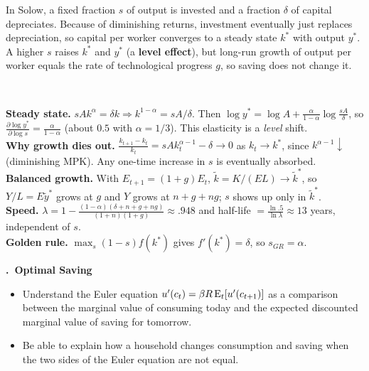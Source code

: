 \documentclass[11pt]{article}
\newcounter{qn}
\newcommand{\question}[1]{\par\needspace{14\baselineskip}\refstepcounter{qn}\medskip
{\bfseries\color{ink}\large \theqn.\ #1}\par\smallskip}
\begin{document}
\begin{resp}
\begin{minipage}[t]{0.62\textwidth}\vspace{0pt}
In Solow, a fixed fraction $s$ of output is invested and a fraction $\delta$ of capital depreciates. Because of diminishing returns, investment eventually just replaces depreciation, so capital per worker converges to a steady state $k^*$ with output $y^*$. A higher $s$ raises $k^*$ and $y^*$ (a \textbf{level effect}), but long-run growth of output per worker equals the rate of technological progress $g$, so saving does not change it.
\end{minipage}\hfill
\begin{minipage}[t]{0.34\textwidth}\vspace{0pt}\centering
\scalebox{0.7}{\figSolow}\\[2pt]
\scalebox{0.7}{\figLevelGrowth}
\end{minipage}
\end{resp}
\begin{intu}
\textbf{Steady state.} $sA k^{\alpha}=\delta k\Rightarrow k^{1-\alpha}=sA/\delta$. Then $\log y^*=\log A+\frac{\alpha}{1-\alpha}\log\frac{sA}{\delta}$, so $\frac{\partial\log y^*}{\partial\log s}=\frac{\alpha}{1-\alpha}$ (about $0.5$ with $\alpha=1/3$). This elasticity is a \emph{level} shift.\\
\textbf{Why growth dies out.} $\frac{k_{t+1}-k_t}{k_t}=sAk_t^{\alpha-1}-\delta\to0$ as $k_t\to k^*$, since $k^{\alpha-1}\downarrow$ (diminishing MPK). Any one-time increase in $s$ is eventually absorbed.\\
\textbf{Balanced growth.} With $E_{t+1}=(1+g)E_t$, $\tilde k=K/(EL)\to\tilde k^*$, so $Y/L=E\tilde y^*$ grows at $g$ and $Y$ grows at $n+g+ng$; $s$ shows up only in $\tilde k^*$.\\
\textbf{Speed.} $\lambda=1-\frac{(1-\alpha)(\delta+n+g+ng)}{(1+n)(1+g)}\approx.948$ and half-life $=\frac{\ln .5}{\ln\lambda}\approx13$ years, independent of $s$.\\
\textbf{Golden rule.} $\max_s(1-s)f(k^*)$ gives $f'(k^*)=\delta$, so $s_{GR}=\alpha$.
\end{intu}

\question{Optimal Saving}
\begin{itemize}[leftmargin=1.2em,itemsep=0pt]\itshape
\item Understand the Euler equation $u'(c_t)=\beta R\,\mathrm{E}_t[u'(c_{t+1})]$ as a comparison between the marginal value of consuming today and the expected discounted marginal value of saving for tomorrow.
\item Be able to explain how a household changes consumption and saving when the two sides of the Euler equation are not equal.
\end{itemize}
\end{document}
